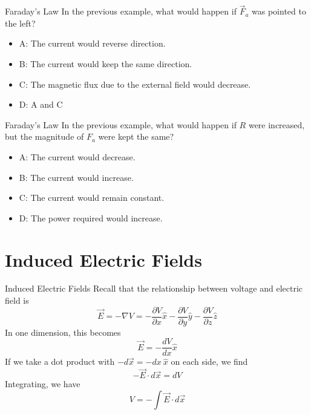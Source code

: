 \documentclass{beamer}
\begin{document}
\begin{frame}{Faraday's Law}
In the previous example, what would happen if $\vec{F}_a$ was pointed to the left?
\begin{itemize}
\item A: The current would reverse direction.
\item B: The current would keep the same direction.
\item C: The magnetic flux due to the external field would decrease.
\item D: A and C
\end{itemize}
\end{frame}

\begin{frame}{Faraday's Law}
In the previous example, what would happen if $R$ were increased, but the magnitude of $F_a$ were kept the same?
\begin{itemize}
\item A: The current would decrease.
\item B: The current would increase.
\item C: The current would remain constant.
\item D: The power required would increase.
\end{itemize}
\end{frame}

\section{Induced Electric Fields}

\begin{frame}{Induced Electric Fields}
Recall that the relationship between voltage and electric field is
\begin{equation}
\vec{E} = - \nabla V = -\frac{\partial V}{\partial x}\hat{x}-\frac{\partial V}{\partial y}\hat{y}-\frac{\partial V}{\partial z}\hat{z}
\end{equation}
In one dimension, this becomes
\begin{equation}
\vec{E} = -\frac{dV}{dx}\hat{x}
\end{equation}
If we take a dot product with $- d\vec{x} = - dx ~ \hat{x}$ on each side, we find
\begin{equation}
-\vec{E} \cdot d\vec{x} = dV
\end{equation}
Integrating, we have
\begin{equation}
V = - \int \vec{E} \cdot d\vec{x}
\end{equation}
\end{frame}
\end{document}
